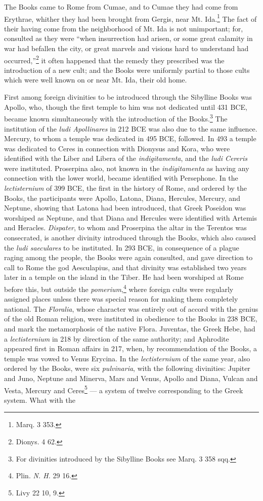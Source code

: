 \documentclass[a4paper, 11pt, oneside, polutonikogreek, english]{article}
\begin{document}
The Books came to Rome from Cumae, and to Cumae they had come from Erythrae, whither they had been brought from Gergis, near Mt. Ida.\footnote{Marq. 3 353.} The fact of their having come from the neighborhood of Mt. Ida is not unimportant; for, consulted as they were ``when insurrection had arisen, or some great calamity in war had befallen the city, or great marvels and visions hard to understand had occurred,''\footnote{Dionys. 4 62.} it often happened that the remedy they prescribed was the introduction of a new cult; and the Books were uniformly partial to those cults which were well known on or near Mt. Ida, their old home.

First among foreign divinities to be introduced through the Sibylline Books was Apollo, who, though the first temple to him was not dedicated until 431 \textsc{BCE}, became known simultaneously with the introduction of the Books.\footnote{For divinities introduced by the Sibylline Books see Marq. 3 358 sqq.} The institution of the \emph{ludi Apollinares} in 212 \textsc{BCE} was also due to the same influence. Mercury, to whom a temple was dedicated in 495 \textsc{BCE}, followed. In 493 a temple was dedicated to Ceres in connection with Dionysus and Kora, who were identified with the Liber and Libera of the \emph{indigitamenta}, and the \emph{ludi Cereris} were instituted. Proserpina also, not known in the \emph{indigitamenta} as having any connection with the lower world, became identified with Persephone. In the \emph{lectisternium} of 399 \textsc{BCE}, the first in the history of Rome, and ordered by the Books, the participants were Apollo, Latona, Diana, Hercules, Mercury, and Neptune, showing that Latona had been introduced, that Greek Poseidon was worshiped as Neptune, and that Diana and Hercules were identified with Artemis and Heracles. \emph{Dispater}, to whom and Proserpina the altar in the Terentos was consecrated, is another divinity introduced through the Books, which also caused the \emph{ludi saeculares} to be instituted. In 293 \textsc{BCE}, in consequence of a plague raging among the people, the Books were again consulted, and gave direction to call to Rome the god Aesculapius, and that divinity was established two years later in a temple on the island in the Tiber. He had been worshiped at Rome before this, but outside the \emph{pomerium},\footnote{Plin. \emph{N. H.} 29 16.} where foreign cults were regularly assigned places unless there was special reason for making them completely national. The \emph{Floralia}, whose character was entirely out of accord with the genius of the old Roman religion, were instituted in obedience to the Books in 238 \textsc{BCE}, and mark the metamorphosis of the native Flora. Juventas, the Greek Hebe, had a \emph{lectisternium} in 218 by direction of the same authority; and Aphrodite appeared first in Roman affairs in 217, when, by recommendation of the Books, a temple was vowed to Venus Erycina. In the \emph{lectisternium} of the same year, also ordered by the Books, were six \emph{pulvinaria}, with the following divinities: Jupiter and Juno, Neptune and Minerva, Mars and Venus, Apollo and Diana, Vulcan and Vesta, Mercury and Ceres\footnote{Livy 22 10, 9.} --- a system of twelve corresponding to the Greek system. What with the 
\end{document}

